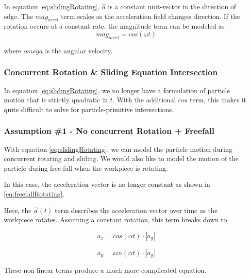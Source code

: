  {
	\label{eq:slidingRotating}
}

In equation \eqref{eq:slidingRotating}, $\hat{a}$ is a constant unit-vector in the direction of edge. The $mag_{accel}$ term scales as the acceleration field changes direction. If the rotation occurs at a constant rate, the magnitude term can be modeled as
$$
mag_{accel} = cos(\omega t)
$$

where $omega$ is the angular velocity.

		\subsubsection{Concurrent Rotation \& Sliding Equation Intersection}

In equation \eqref{eq:slidingRotating}, we no longer have a formulation of particle motion that is strictly quadratic in $t$. With the additional $cos$ term, this makes it quite difficult to solve for particle-primitive intersections.

		\subsubsection{Assumption \#1 - No concurrent Rotation + Freefall}

With equation \eqref{eq:slidingRotating}, we can model the particle motion during concurrent rotating and sliding. We would also like to model the motion of the particle during free-fall when the workpiece is rotating.

In this case, the acceleration vector is no longer constant as shown in \eqref{eq:freefallRotating}.

 {
	\label{eq:freefallRotating}
}

Here, the $\vec{a}(t)$ term describes the acceleration vector over time as the workpiece rotates. Assuming a constant rotation, this term breaks down to

$$
a_x = cos(\alpha t) \cdot |a_g|
$$

$$
a_y = sin(\alpha t) \cdot |a_g|
$$

These non-linear terms produce a much more complicated equation.



